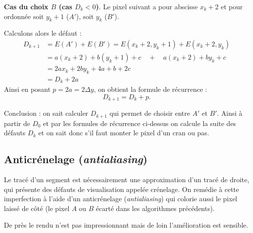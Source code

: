 \documentclass[11pt,class=report,crop=false]{standalone}
\begin{document}
\begin{itemize}
	
	\textbf{Cas du choix $B$ (cas $D_k<0$)}.	
	Le pixel suivant a pour abscisse $x_k+2$ et pour ordonnée soit $y_k+1$ ($A'$), soit $y_k$ ($B'$).


	Calculons alors le défaut :
	\begin{align*}
		D_{k+1} 
		&= E(A') + E(B') = E(x_k+2,y_k+1)+E(x_k+2,y_k) \\
		&= a (x_k+2) +b(y_k+1) + c \quad + \quad a (x_k+2) +by_k + c  \\
		&= 2a x_k + 2by_k + 4a+b+2c\\
		&= D_k + 2a
	\end{align*}
	Ainsi en posant $p = 2a = 2\Delta y$, on obtient la formule de récurrence :
	$$D_{k+1} = D_k + p.$$
	
	Conclusion : on sait calculer $D_{k+1}$ qui permet de choisir entre $A'$ et $B'$.
	Ainsi à partir de $D_0$ et par les formules de récurrence ci-dessus on calcule la suite des défauts $D_{k}$ et on sait donc s'il faut monter le pixel d'un cran ou pas.
		
\end{itemize}



\subsection{Anticrénelage (\emph{antialiasing})}


Le tracé d'un segment est nécessairement une approximation d'un tracé de droite, qui présente des défauts de visualisation appelée \og{}crénelage\fg{}. On remédie à cette imperfection à l'aide d'un 
anticrénelage (\emph{antialiasing}) qui colorie aussi le pixel laissé de côté (le pixel $A$ ou $B$ écarté dans les algorithmes précédents).






De près le rendu n'est pas impressionnant mais de loin l'amélioration est sensible.
\end{document}
